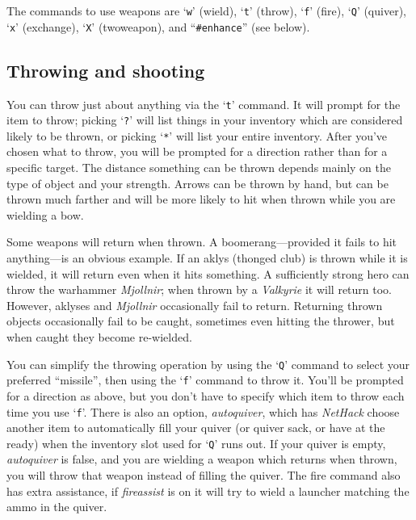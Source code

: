 \documentclass[titlepage]{article}
\begin{document}
The commands to use weapons are `\texttt{w}' (wield), `\texttt{t}' (throw),
`\texttt{f}' (fire), `\texttt{Q}' (quiver),
`\texttt{x}' (exchange), `\texttt{X}' (twoweapon), and ``\texttt{\#enhance}''
(see below).

\subsection*{Throwing and shooting}

You can throw just about anything via the `\texttt{t}' command.  It will prompt
for the item to throw; picking `\texttt{?}' will list things in your inventory
which are considered likely to be thrown, or picking `\texttt{*}' will list
your entire inventory.  After you've chosen what to throw, you will
be prompted for a direction rather than for a specific target.  The
distance something can be thrown depends mainly on the type of object
and your strength.  Arrows can be thrown by hand, but can be thrown
much farther and will be more likely to hit when thrown while you are
wielding a bow.

Some weapons will return when thrown.
A boomerang---provided it fails to hit anything---is an obvious example.
If an aklys (thonged club) is thrown while it is wielded, it will return
even when it hits something.
A sufficiently strong hero can throw the warhammer \textit{Mjollnir};
when thrown by a \textit{Valkyrie} it will return too.
However, aklyses and \textit{Mjollnir} occasionally fail to return.
Returning thrown objects occasionally fail to be caught, sometimes even
hitting the thrower, but when caught they become re-wielded.

You can simplify the throwing operation by using the `\texttt{Q}' command to
select your preferred ``missile'', then using the `\texttt{f}' command to
throw it.  You'll be prompted for a direction as above, but you don't
have to specify which item to throw each time you use `\texttt{f}'.  There is
also an option,
\textit{autoquiver},
which has \textit{NetHack} choose another item to automatically fill your
quiver (or quiver sack, or have at the ready) when the inventory slot used
for `\texttt{Q}' runs out.
If your quiver is empty, \textit{autoquiver}
is false, and you are wielding a weapon which returns when thrown,
you will throw that weapon instead of filling the quiver.
The fire command also has extra assistance, if \textit{fireassist}
is on it will try to wield a launcher matching the ammo in the quiver.
\end{document}
